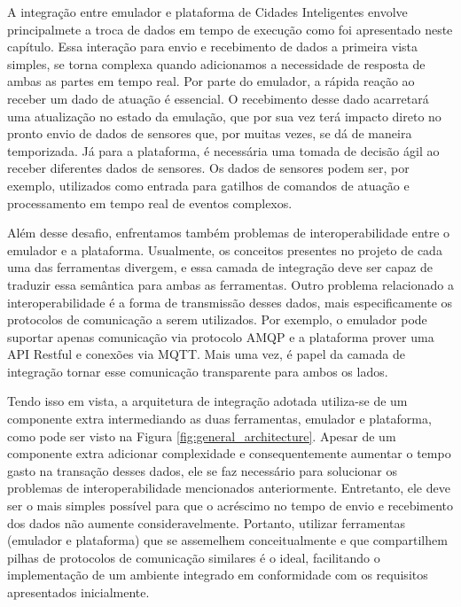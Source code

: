 A integração entre emulador e plataforma de Cidades Inteligentes envolve principalmete a troca de dados em tempo de execução como foi apresentado neste capítulo.
Essa interação para envio e recebimento de dados a primeira vista simples, se torna complexa quando adicionamos a necessidade de resposta de ambas as partes em tempo real.
Por parte do emulador, a rápida reação ao receber um dado de atuação é essencial.
O recebimento desse dado acarretará uma atualização no estado da emulação, que por sua vez terá impacto direto no pronto envio de dados de sensores que, por muitas vezes,
se dá de maneira temporizada.
Já para a plataforma, é necessária uma tomada de decisão ágil ao receber diferentes dados de sensores.
Os dados de sensores podem ser, por exemplo, utilizados como entrada para gatilhos de comandos de atuação e processamento em tempo real de eventos complexos.

Além desse desafio, enfrentamos também problemas de interoperabilidade entre o emulador e a plataforma.
Usualmente, os conceitos presentes no projeto de cada uma das ferramentas divergem, e essa camada de integração deve ser capaz de traduzir essa semântica para ambas as ferramentas.
Outro problema relacionado a interoperabilidade é a forma de transmissão desses dados, mais especificamente os protocolos de comunicação a serem utilizados.
Por exemplo, o emulador pode suportar apenas comunicação via protocolo AMQP e a plataforma prover uma API Restful e conexões via MQTT.
Mais uma vez, é papel da camada de integração tornar esse comunicação transparente para ambos os lados.

Tendo isso em vista, a arquitetura de integração adotada utiliza-se de um componente extra intermediando as duas ferramentas, emulador e plataforma, como pode ser visto na
Figura \ref{fig:general_architecture}.
Apesar de um componente extra adicionar complexidade e consequentemente aumentar o tempo gasto na transação desses dados, ele se faz necessário para solucionar os problemas
de interoperabilidade mencionados anteriormente.
Entretanto, ele deve ser o mais simples possível para que o acréscimo no tempo de envio e recebimento dos dados não aumente consideravelmente.
Portanto, utilizar ferramentas (emulador e plataforma) que se assemelhem conceitualmente e que compartilhem pilhas de protocolos de comunicação similares é o ideal,
facilitando o implementação de um ambiente integrado em conformidade com os requisitos apresentados inicialmente.

